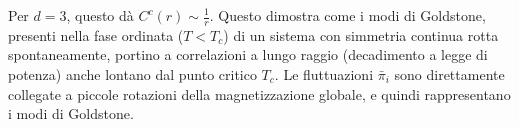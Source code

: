 Per $d=3$, questo dà $C^c(r) \sim \frac{1}{r}$.
Questo dimostra come i modi di Goldstone, presenti nella fase ordinata ($T < T_c$) di un sistema con simmetria continua rotta spontaneamente, portino a correlazioni a lungo raggio (decadimento a legge di potenza) anche lontano dal punto critico $T_c$. Le fluttuazioni $\bar{\pi}_i$ sono direttamente collegate a piccole rotazioni della magnetizzazione globale, e quindi rappresentano i modi di Goldstone.
